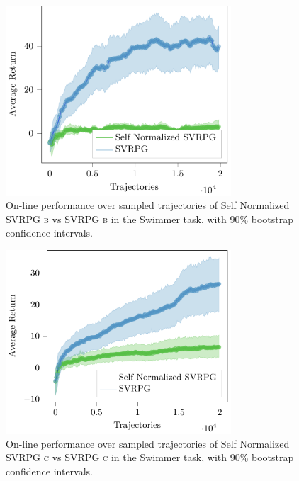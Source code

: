 \begin{figure}[h]
	\begin{minipage}[h]{1\textwidth}
		\centering
		\includegraphics[width=0.75\textwidth]{Images/Experiments/swimmer_SVRPG_vs_sn_SVRPG_B.pdf}
		\vspace{-0.1in}
		\caption{On-line performance over sampled trajectories of Self Normalized \acs{SVRPG} \textsc{b} vs \acs{SVRPG} \textsc{b} in the Swimmer task, with 90\% bootstrap confidence intervals.}
		\label{fig:swimmernine}
	\end{minipage}
	\vspace{-0.15in}
\end{figure}
\begin{figure}[h]
	\begin{minipage}[h]{1\textwidth}
		\centering
		\includegraphics[width=0.75\textwidth]{Images/Experiments/swimmer_SVRPG_vs_sn_SVRPG_C.pdf}
		\vspace{-0.1in}
		\caption{On-line performance over sampled trajectories of Self Normalized \acs{SVRPG} \textsc{c} vs \acs{SVRPG} \textsc{c} in the Swimmer task, with 90\% bootstrap confidence intervals.}
		\label{fig:swimmerten}
	\end{minipage}
	\vspace{-0.15in}
\end{figure}

